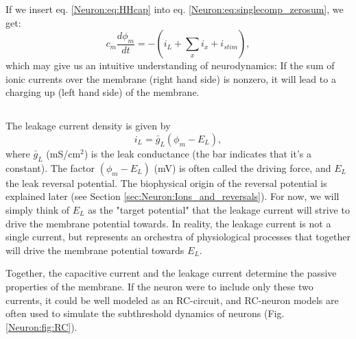 If we insert eq. \ref{Neuron:eq:HHcap} into eq. \ref{Neuron:eq:singlecomp_zerosum}, we get:
\begin{equation}
c_m \frac{d\phi_m}{dt} = - (i_L + \sum_x{i_x} +  i_{stim}),
\label{Neuron:eq:singlecomp_capinserted}
\end{equation}
which may give us an intuitive understanding of neurodynamics: If the sum of ionic currents over the membrane (right hand side) is nonzero, it will lead to a charging up (left hand side) of the membrane. 


\subsection{}
\label{sec:Neuron:leak}

The leakage current density is given by
\begin{equation}
i_L = \bar{g}_L (\phi_m - E_L),
\label{Neuron:eq:HHleak}
\end{equation}
where $\bar{g}_L$ (mS/cm$^2$) is the leak conductance (the bar indicates that it's a constant). The factor $(\phi_m - E_L)$ (mV) is often called the driving force, and $E_L$ the leak reversal potential. The biophysical origin of the reversal potential is explained later (see Section \ref{sec:Neuron:Ions_and_reversals}). For now, we will simply think of $E_L$ as the "target potential" that the leakage current will strive to drive the membrane potential towards. In reality, the leakage current is not a single current, but represents an orchestra of physiological processes that together will drive the membrane potential towards $E_L$. 

Together, the capacitive current and the leakage current determine the passive properties of the membrane. If the neuron were to include only these two currents, it could be well modeled as an RC-circuit, and RC-neuron models are often used to simulate the subthreshold dynamics of neurons (Fig. \ref{Neuron:fig:RC}). 

